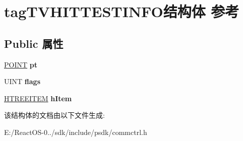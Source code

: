\hypertarget{structtag_t_v_h_i_t_t_e_s_t_i_n_f_o}{}\section{tag\+T\+V\+H\+I\+T\+T\+E\+S\+T\+I\+N\+F\+O结构体 参考}
\label{structtag_t_v_h_i_t_t_e_s_t_i_n_f_o}
\subsection*{Public 属性}
\begin{DoxyCompactItemize}
\item 
\mbox{\label{structtag_t_v_h_i_t_t_e_s_t_i_n_f_o_a7db490aafc704847305e45a474b51d97}} 
\hyperlink{structtag_p_o_i_n_t}{P\+O\+I\+NT} {\bfseries pt}
\item 
\mbox{\label{structtag_t_v_h_i_t_t_e_s_t_i_n_f_o_a43c50bf29a98c84013df29ed347a8328}} 
U\+I\+NT {\bfseries flags}
\item 
\mbox{\label{structtag_t_v_h_i_t_t_e_s_t_i_n_f_o_ad348497e758e542444025ca8c985e3d9}} 
\hyperlink{struct___t_r_e_e_i_t_e_m}{H\+T\+R\+E\+E\+I\+T\+EM} {\bfseries h\+Item}
\end{DoxyCompactItemize}


该结构体的文档由以下文件生成\+:\begin{DoxyCompactItemize}
\item 
E\+:/\+React\+O\+S-\/0../sdk/include/psdk/commctrl.\+h\end{DoxyCompactItemize}
